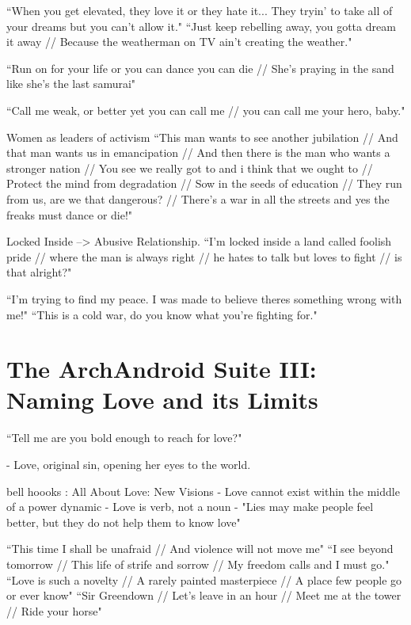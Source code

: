 \documentclass[a4paper, 11pt]{article} %
\begin{document}
``When you get elevated, they love it or they hate it... They tryin' to take all of your dreams but you can't allow it."\cite{danceordie}
``Just keep rebelling away, you gotta dream it away // Because the weatherman on TV ain't creating the weather."\cite{danceordie}

``Run on for your life or you can dance you can die // She's praying in the sand like she's the last samurai"\cite{danceordie}

``Call me weak, or better yet you can call me // you can call me your hero, baby."\cite{faster}

Women as leaders of activism
``This man wants to see another jubilation //
And that man wants us in emancipation //
And then there is the man who wants a stronger nation //
You see we really got to and i think that we ought to //
Protect the mind from degradation //
Sow in the seeds of education //
They run from us, are we that dangerous? //
There's a war in all the streets and yes the freaks must dance or die!"\cite{danceordie}

Locked Inside --> Abusive Relationship.
``I'm locked inside a land called foolish pride // where the man is always right // he hates to talk but loves to fight // is that alright?"\cite{lockedinside}

``I'm trying to find my peace.  I was made to believe theres something wrong with me!"\cite{coldwar}
``This is a cold war, do you know what you're fighting for."\cite{coldwar}




\section*{The ArchAndroid Suite III: Naming Love and its Limits}

``Tell me are you bold enough to reach for love?"\cite{manymoons}

- Love, original sin, opening her eyes to the world.

bell hoooks : All About Love: New Visions
- Love cannot exist within the middle of a power dynamic
- Love is verb, not a noun
- "Lies may make people feel better, but they do not help them to know love" 

``This time I shall be unafraid // And violence will not move me"\cite{babopbyeya}
``I see beyond tomorrow // This life of strife and sorrow // My freedom calls and I must go."\cite{babopbyeya}
``Love is such a novelty // A rarely painted masterpiece // A place few people go or ever know"\cite{sayyouwillgo}
``Sir Greendown // Let's leave in an hour // Meet me at the tower // Ride your horse"\cite{greendown}
\end{document}
